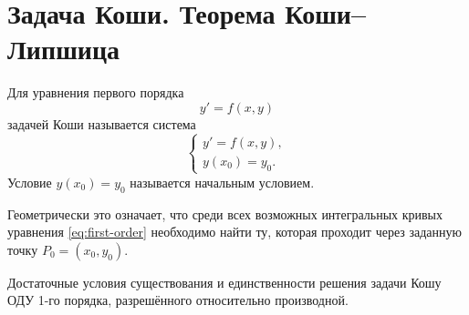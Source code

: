\documentclass[12pt,a4paper]{article}
\numberwithin{equation}{section}
\DeclareRobustCommand{\examtag}[1]{\space{\normalfont\small\color{HSEgray}(#1)}}
\begin{document}
\section{Задача Коши. Теорема Коши--Липшица\examtag{вопрос~4}}

\begin{definitionHSE}
Для уравнения первого порядка
\[
y'=f(x,y)
\]
задачей Коши называется система
\begin{equation}
\begin{cases}
 y'=f(x,y),\\
 y(x_0)=y_0.
\end{cases}
\label{eq:cauchy}
\end{equation}
Условие $y(x_0)=y_0$ называется начальным условием.
\end{definitionHSE}

Геометрически это означает, что среди всех возможных интегральных кривых уравнения \eqref{eq:first-order} необходимо найти ту, которая проходит через заданную точку \(P_0=(x_0,y_0)\).

\begin{theoremHSE}
Достаточные условия существования и единственности решения задачи Кошу ОДУ 1-го порядка, разрешённого относительно производной.
\end{theoremHSE}
\end{document}
